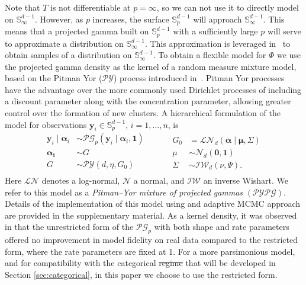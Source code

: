Note that $T$ is not differentiable at $p = \infty$, so we can not use it to 
    directly model on ${\mathbb S}_{\infty}^{d-1}$. However, as $p$ increases,
    the surface $\mathbb{S}_p^{d-1}$ will approach $\mathbb{S}_{\infty}^{d-1}$.
    This means that a projected gamma built on $\mathbb{S}_p^{d-1}$ with a
    sufficiently large $p$ will serve to approximate a distribution on 
    $\mathbb{S}_{\infty}^{d-1}$.  This approximation is leveraged 
    in~\cite{trubey:pg} to obtain samples of a distribution on 
    ${\mathbb S}_{\infty}^{d-1}$. To obtain a flexible model for $\Phi$ we use 
    the projected gamma density as the kernel of a random measure mixture model, 
    based on the Pitman Yor ($\mathcal{PY}$) process introduced 
    in~\cite{perman1992}. Pitman Yor processes have the advantage over the more 
    commonly used Dirichlet processes \citep{Ferguson74} of including a 
    discount parameter along with the concentration parameter, allowing greater 
    control over the formation of new clusters.  A hierarchical formulation of 
    the model for observations 
    $\bm{y}_i\in \mathbb{S}_{p}^{d-1}$, $i=1,\ldots,n$, is
    \begin{equation}
        \label{eqn:modelsphere}
        \begin{aligned}
        \bm{y}_i \mid \bm{\alpha}_i &\sim \mathcal{PG}_p
                \left(\bm{y}_i\mid\bm{\alpha}_i, \bm{1}\right)\\
        \bm{\alpha_i} &\sim G\\
        G &\sim \mathcal{PY}\left(d, \eta, G_0\right)\\
        \end{aligned}
        ~\hspace{1cm}
        \begin{aligned}
        G_0 &= \mathcal{LN}_d\left(\bm{\alpha}\mid\bm{\mu},\Sigma\right)\\
        \mu &\sim \mathcal{N}_d\left(\bm{0},\bm{1}\right)\\
        \Sigma &\sim \mathcal{IW}_d\left(\nu, \Psi\right).
        \end{aligned}
    \end{equation}
    Here $\mathcal{LN}$ denotes a log-normal, $\mathcal{N}$ a normal, and 
    $\mathcal{IW}$ an inverse Wishart.  We refer to this model as a
    \emph{Pitman--Yor mixture of projected gammas} $(\mathcal{PYPG})$.
    Details of the implementation of this 
    model using and adaptive MCMC approach are provided in the supplementary 
    material.  As a kernel density, it was observed in \cite{trubey:pg} that 
    the unrestricted form of the $\mathcal{PG}_p$ with both shape and rate 
    parameters offered no improvement in model fidelity on real data compared to 
    the restricted form, where the rate parameters are fixed at 1.  For a more 
    parsimonious model, and for compatibility with the categorical \st{regime}
    that will be developed in Section \ref{sec:categorical}, in 
    this paper we choose to use the restricted form.

